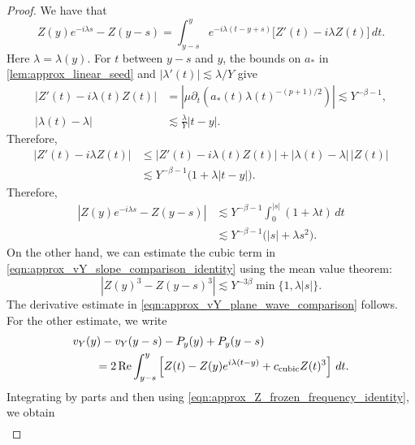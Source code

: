\documentclass[11pt]{amsart}
\theoremstyle{definition}
\theoremstyle{remark}
\numberwithin{equation}{section}
\begin{document}
\begin{proof}
    We have that
    \begin{equation}\label{eqn:approx_Z_frozen_frequency_identity}
        Z(y)e^{-i\lambda s} - Z(y - s) = \int_{y-s}^{y}e^{-i\lambda(t-y+s)}\bigl[Z'(t)-i\lambda Z(t)\bigr]\,dt.
    \end{equation}
    Here $\lambda=\lambda(y)$. For $t$ between $y-s$ and $y$, the bounds on $a_*$ in \cref{lem:approx_linear_seed} and $|\lambda'(t)|\lesssim\lambda/Y$ give
    \begin{align*}
        |Z'(t)-i\lambda(t)Z(t)|
        &=\left|\mu\partial_t\left(a_*(t)\lambda(t)^{-(p+1)/2}\right)\right|
        \lesssim Y^{-\beta-1},\\
        |\lambda(t)-\lambda|&\lesssim\frac{\lambda}{Y}|t-y|.
    \end{align*}
    Therefore,
    \begin{align*}
        |Z'(t)-i\lambda Z(t)|
        &\leq |Z'(t)-i\lambda(t)Z(t)|+|\lambda(t)-\lambda|\,|Z(t)|\\
        &\lesssim Y^{-\beta-1}\bigl(1+\lambda|t-y|\bigr).
    \end{align*}
    Therefore,
    \begin{equation}\label{eqn:approx_Z_plane_wave_comparison}
        \begin{aligned}
            |Z(y)e^{-i\lambda s}-Z(y-s)|
            &\lesssim Y^{-\beta-1}\int_0^{|s|}(1+\lambda t)\,dt\\
            &\lesssim Y^{-\beta-1}\bigl(|s|+\lambda s^2\bigr).
        \end{aligned}
    \end{equation}
    On the other hand, we can estimate the cubic term in \eqref{eqn:approx_vY_slope_comparison_identity} using the mean value theorem:
    \[|Z(y)^3-Z(y-s)^3| \lesssim Y^{-3\beta}\min\{1,\lambda|s|\}.\]
    The derivative estimate in \eqref{eqn:approx_vY_plane_wave_comparison} follows. For the other estimate, we write
    \begin{equation}\label{eqn:approx_vY_value_comparison_identity}
        \begin{aligned}
            &v_Y(y)-v_Y(y-s)-P_y(y)+P_y(y-s)\\
            &\qquad=2\operatorname{Re}\int_{y-s}^{y}
            \left[Z(t)-Z(y)e^{i\lambda(t-y)}+c_{\textup{cubic}}Z(t)^3\right]\,dt.
        \end{aligned}
    \end{equation}
    Integrating by parts and then using \eqref{eqn:approx_Z_frozen_frequency_identity}, we obtain
    \begin{align*}

\end{align*}
\end{proof}
\end{document}
